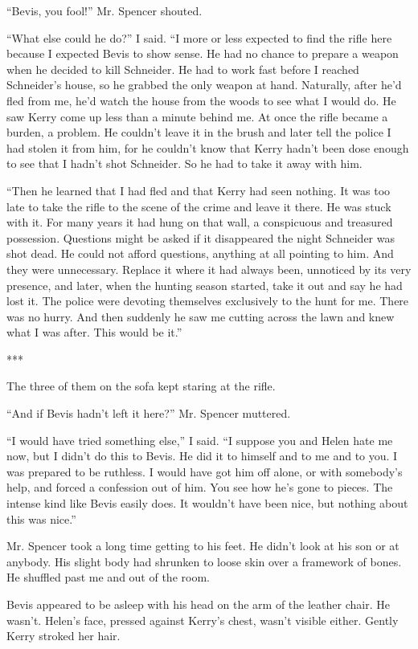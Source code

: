 \documentclass{novel}
\begin{document}
{“Bevis, you fool!” Mr. Spencer shouted.

“What else could he do?” I said. “I more or less expected to find the rifle here because I expected Bevis to show sense. He had no chance to prepare a weapon when he decided to kill Schneider. He had to work fast before I reached Schneider’s house, so he grabbed the only weapon at hand. Naturally, after he’d fled from me, he’d watch the house from the woods to see what I would do. He saw Kerry come up less than a minute behind me. At once the rifle became a burden, a problem. He couldn’t leave it in the brush and later tell the police I had stolen it from him, for he couldn’t know that Kerry hadn’t been dose enough to see that I hadn’t shot Schneider. So he had to take it away with him.

“Then he learned that I had fled and that Kerry had seen nothing. It was too late to take the rifle to the scene of the crime and leave it there. He was stuck with it. For many years it had hung on that wall, a conspicuous and treasured possession. Questions might be asked if it disappeared the night Schneider was shot dead. He could not afford questions, anything at all pointing to him. And they were unnecessary. Replace it where it had always been, unnoticed by its very presence, and later, when the hunting season started, take it out and say he had lost it. The police were devoting themselves exclusively to the hunt for me. There was no hurry. And then suddenly he saw me cutting across the lawn and knew what I was after. This would be it.”

***

The three of them on the sofa kept staring at the rifle.

“And if Bevis hadn’t left it here?” Mr. Spencer muttered.

“I would have tried something else,” I said. “I suppose you and Helen hate me now, but I didn’t do this to Bevis. He did it to himself and to me and to you. I was prepared to be ruthless. I would have got him off alone, or with somebody’s help, and forced a confession out of him. You see how he’s gone to pieces. The intense kind like Bevis easily does. It wouldn’t have been nice, but nothing about this was nice.”

Mr. Spencer took a long time getting to his feet. He didn’t look at his son or at anybody. His slight body had shrunken to loose skin over a framework of bones. He shuffled past me and out of the room.

Bevis appeared to be asleep with his head on the arm of the leather chair. He wasn’t. Helen’s face, pressed against Kerry’s chest, wasn’t visible either. Gently Kerry stroked her hair.

}
\end{document}
